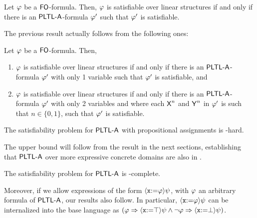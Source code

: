 \begin{lemma}
 Let $\varphi$ be a ${\rm\textsf{FO}}$-formula. Then, $\varphi$ is satisfiable over linear structures if and only if there is an ${\rm\textsf{PLTL-A}}$-formula $\varphi'$ such that $\varphi'$ is satisfiable. 
\end{lemma}

The previous result actually follows from the following ones:

\begin{lemma}
    Let $\varphi$ be a ${\rm\textsf{FO}}$-formula. Then, 
    \begin{enumerate}
        \item $\varphi$ is satisfiable over linear structures if and only if there is an ${\rm\textsf{PLTL-A}}$-formula $\varphi'$ with only 1 variable such that $\varphi'$ is satisfiable, and 
        \item $\varphi$ is satisfiable over linear structures if and only if there is an ${\rm\textsf{PLTL-A}}$-formula $\varphi'$ with only 2 variables and where each ${\operatorname{\sf X}}^n$ and ${\operatorname{\sf Y}}^n$ in $\varphi'$ is such that $n\in\{0,1\}$, such that $\varphi'$ is satisfiable.
    \end{enumerate}
\end{lemma}

\begin{corollary}
    The satisfiability problem for ${\rm\textsf{PLTL-A}}$ with propositional assignments is \tower-hard.
\end{corollary}

The \tower upper bound will follow from the result in the next sections, establishing that ${\rm\textsf{PLTL-A}}$ over more expressive concrete domains are also in \tower.





\begin{theorem}
    The satisfiability problem for ${\rm\textsf{PLTL-A}}$ is \tower-complete.
\end{theorem}

Moreover, if we allow expressions of the form ${\langle{\mathtt{x}{:=}\varphi}\rangle}\psi$, with $\varphi$ an arbitrary formula of ${\rm\textsf{PLTL-A}}$, our results also follow. In particular,  ${\langle{\mathtt{x}{:=}\varphi}\rangle}\psi$ can be internalized into the base language as $(\varphi\Rightarrow{\langle{\mathtt{x}{:=}\top}\rangle}\psi \wedge \neg\varphi\Rightarrow{\langle{\mathtt{x}{:=}\bot}\rangle}\psi)$.



